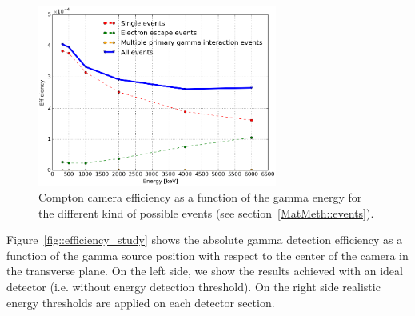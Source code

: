 \begin{figure} [!hbtp]	
\centering
\includegraphics[width=0.7\textwidth]{./Figure/new/effVSenergy_trigger.png}
\caption{Compton camera efficiency as a function of the gamma energy for the different kind of possible events (see section~\ref{MatMeth::events}).}
\label{fig::eff_evKind}
\end{figure}

Figure~\ref{fig::efficiency_study} shows the absolute gamma detection efficiency as a function of the gamma source position with respect to the center of the camera in the transverse plane. On the left side, we show the results achieved with an ideal detector (i.e. without energy detection threshold). On the right side realistic energy thresholds are applied on each detector section.

